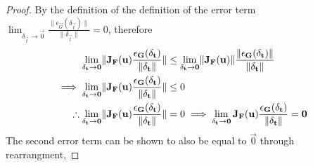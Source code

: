 \begin{lemma}
\begin{proof}
        By the definition of the definition of the error term $\lim_{\delta_\vec{t}\rightarrow\vec{0}}\frac{\lVert\epsilon_\vec{G}(\delta_\vec{t})\rVert}{\lVert\delta_\vec{t}\rVert}=0$, therefore
        \begin{align*}
            \lim_{\delta_{\mathbf{t}}\rightarrow\mathbf{0}}\lVert\mathbf{J}_{\mathbf{F}}(\mathbf{u})\frac{\epsilon_{\mathbf{G}}(\delta_{\mathbf{t}})}{\lVert\delta_{\mathbf{t}}\rVert}\rVert&\leq\lim_{\delta_{\mathbf{t}}\rightarrow\mathbf{0}}\lVert\mathbf{J}_{\mathbf{F}}(\mathbf{u})\rVert\frac{\lVert\epsilon_{\mathbf{G}}(\delta_{\mathbf{t}})\rVert}{\lVert\delta_{\mathbf{t}}\rVert}\\
            \implies\lim_{\delta_{\mathbf{t}}\rightarrow\mathbf{0}}\lVert\mathbf{J}_{\mathbf{F}}(\mathbf{u})\frac{\epsilon_{\mathbf{G}}(\delta_{\mathbf{t}})}{\lVert\delta_{\mathbf{t}}\rVert}\rVert&\leq0\\
            \therefore\lim_{\delta_{\mathbf{t}}\rightarrow\mathbf{0}}\lVert\mathbf{J}_{\mathbf{F}}(\mathbf{u})\frac{\epsilon_{\mathbf{G}}(\delta_{\mathbf{t}})}{\lVert\delta_{\mathbf{t}}\rVert}\rVert&=0\implies\lim_{\delta_{\mathbf{t}}\rightarrow\mathbf{0}}\mathbf{J}_{\mathbf{F}}(\mathbf{u})\frac{\epsilon_{\mathbf{G}}(\delta_{\mathbf{t}})}{\lVert\delta_{\mathbf{t}}\rVert}=\mathbf{0}
        \end{align*}
        The second error term can be shown to also be equal to $\vec{0}$ through rearrangment,

\end{proof}
\end{lemma}
